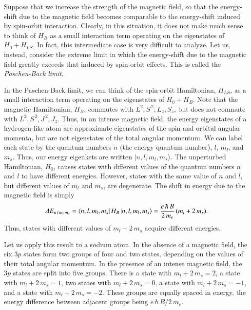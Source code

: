Suppose that we increase the strength of the magnetic
field, so that the energy-shift due to the magnetic field becomes
comparable to the energy-shift induced by spin-orbit interaction. 
Clearly, in this situation, it does not make much sense to think
of $H_B$ as a small interaction term operating on the eigenstates
of $H_0 + H_{LS}$. In fact, this intermediate case is very difficult
to analyze. Let us, instead, consider the extreme limit in which the energy-shift
due to the magnetic field greatly exceeds that induced by spin-orbit effects.
This  is called the {\em Paschen-Back limit}. 

In the Paschen-Back
limit, we can think of the spin-orbit Hamiltonian, $H_{LS}$, as
a small interaction term operating on the eigenstates of
$H_0 + H_B$. Note that the magnetic Hamiltonian, $H_B$, commutes
with $L^2, S^{\,2}, L_z, S_z$, but does not commute with $L^2, S^{\,2}, J^{\,2},
J_z$. Thus, in an intense magnetic field, the energy eigenstates of
a hydrogen-like atom are approximate eigenstates of the 
spin and orbital angular momenta,  but are not eigenstates of the
total angular momentum. We can label each state by the quantum
numbers $n$ (the energy quantum number), $l$, $m_l$, and $m_s$. 
Thus, our energy eigenkets are written $|n, l,m_l, m_s\rangle$. 
The unperturbed Hamiltonian, $H_0$, causes states with different
values of the quantum numbers $n$ and $l$ to have different energies. 
However, states with the same value of $n$ and $l$, but different
values of $m_l$ and $m_s$, are degenerate.
The shift in energy due to the magnetic field is simply
\begin{equation}
{\mit\Delta} E_{n\,l\,m_l\, m_s}= \langle n,l,m_l, m_s|\, H_B\,| n,l,m_l, m_s\rangle
= \frac{e\, \hbar \,B} {2 \,m_e} \,(m_l + 2 \,m_s).
\end{equation}
Thus, states with different values of $m_l + 2\, m_s$ acquire different
energies. 

Let us apply this result to a sodium atom. In the absence of
a magnetic field, the six $3p$ states form two groups of four and
two states, depending on the values of their total angular momentum.
In the presence of an intense magnetic field, the $3p$  states are split
into five groups. There is  a state with $m_l+2\,m_s = 2$,
a state with $m_l+2\,m_s = 1$, two states with $m_l+2\,m_s = 0$,
a state with $m_l+2\,m_s = -1$, and a state with
$m_l+2\,m_s = -2$.  These groups are equally spaced in energy,
the energy difference between adjacent groups being 
$e \,\hbar\, B/ 2\,m_e$. 

